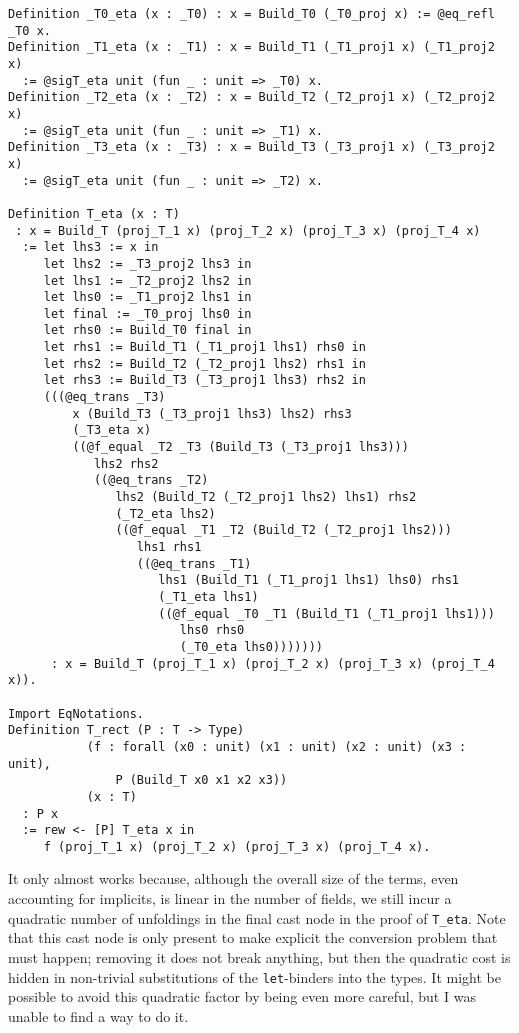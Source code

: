 \begin{verbatim}
Definition _T0_eta (x : _T0) : x = Build_T0 (_T0_proj x) := @eq_refl _T0 x.
Definition _T1_eta (x : _T1) : x = Build_T1 (_T1_proj1 x) (_T1_proj2 x)
  := @sigT_eta unit (fun _ : unit => _T0) x.
Definition _T2_eta (x : _T2) : x = Build_T2 (_T2_proj1 x) (_T2_proj2 x)
  := @sigT_eta unit (fun _ : unit => _T1) x.
Definition _T3_eta (x : _T3) : x = Build_T3 (_T3_proj1 x) (_T3_proj2 x)
  := @sigT_eta unit (fun _ : unit => _T2) x.

Definition T_eta (x : T)
 : x = Build_T (proj_T_1 x) (proj_T_2 x) (proj_T_3 x) (proj_T_4 x)
  := let lhs3 := x in
     let lhs2 := _T3_proj2 lhs3 in
     let lhs1 := _T2_proj2 lhs2 in
     let lhs0 := _T1_proj2 lhs1 in
     let final := _T0_proj lhs0 in
     let rhs0 := Build_T0 final in
     let rhs1 := Build_T1 (_T1_proj1 lhs1) rhs0 in
     let rhs2 := Build_T2 (_T2_proj1 lhs2) rhs1 in
     let rhs3 := Build_T3 (_T3_proj1 lhs3) rhs2 in
     (((@eq_trans _T3)
         x (Build_T3 (_T3_proj1 lhs3) lhs2) rhs3
         (_T3_eta x)
         ((@f_equal _T2 _T3 (Build_T3 (_T3_proj1 lhs3)))
            lhs2 rhs2
            ((@eq_trans _T2)
               lhs2 (Build_T2 (_T2_proj1 lhs2) lhs1) rhs2
               (_T2_eta lhs2)
               ((@f_equal _T1 _T2 (Build_T2 (_T2_proj1 lhs2)))
                  lhs1 rhs1
                  ((@eq_trans _T1)
                     lhs1 (Build_T1 (_T1_proj1 lhs1) lhs0) rhs1
                     (_T1_eta lhs1)
                     ((@f_equal _T0 _T1 (Build_T1 (_T1_proj1 lhs1)))
                        lhs0 rhs0
                        (_T0_eta lhs0)))))))
      : x = Build_T (proj_T_1 x) (proj_T_2 x) (proj_T_3 x) (proj_T_4 x)).

Import EqNotations.
Definition T_rect (P : T -> Type)
           (f : forall (x0 : unit) (x1 : unit) (x2 : unit) (x3 : unit),
               P (Build_T x0 x1 x2 x3))
           (x : T)
  : P x
  := rew <- [P] T_eta x in
     f (proj_T_1 x) (proj_T_2 x) (proj_T_3 x) (proj_T_4 x).
\end{verbatim}
  It only almost works because, although the overall size of the terms, even accounting for implicits, is linear in the number of fields, we still incur a quadratic number of unfoldings in the final cast node in the proof of \texttt{T_eta}.
  Note that this cast node is only present to make explicit the conversion problem that must happen; removing it does not break anything, but then the quadratic cost is hidden in non-trivial substitutions of the \texttt{let}-binders into the types.
  It might be possible to avoid this quadratic factor by being even more careful, but I was unable to find a way to do it.%
